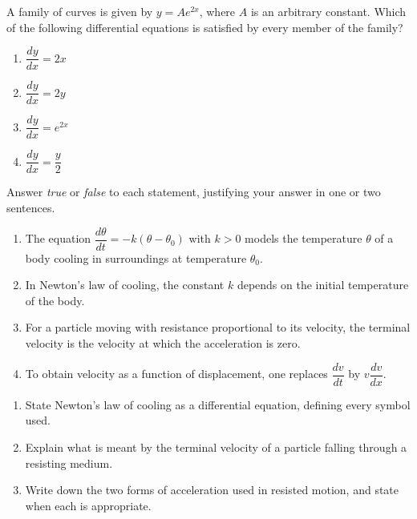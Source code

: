 \documentclass[11pt]{article}
\newcommand{\cle}[1]{{\popxbold\color{popdark}#1}}
\begin{document}
\begin{exercice}
A family of curves is given by $y = A e^{2x}$, where $A$ is an arbitrary constant. Which of the following differential equations is satisfied by every member of the family?

\begin{enumerate}
\item $\dfrac{dy}{dx} = 2x$
\item $\dfrac{dy}{dx} = 2y$
\item $\dfrac{dy}{dx} = e^{2x}$
\item $\dfrac{dy}{dx} = \dfrac{y}{2}$
\end{enumerate}
\end{exercice}

\begin{exercice}
Answer \emph{true} or \emph{false} to each statement, justifying your answer in one or two sentences.

\begin{enumerate}
\item The equation $\dfrac{d\theta}{dt} = -k(\theta - \theta_0)$ with $k > 0$ models the temperature $\theta$ of a body cooling in surroundings at temperature $\theta_0$.
\item In Newton's law of cooling, the constant $k$ depends on the initial temperature of the body.
\item For a particle moving with resistance proportional to its velocity, the terminal velocity is the velocity at which the acceleration is zero.
\item To obtain velocity as a function of displacement, one replaces $\dfrac{dv}{dt}$ by $v\dfrac{dv}{dx}$.
\end{enumerate}
\end{exercice}

\begin{exercice}
\begin{enumerate}
\item State Newton's law of cooling as a differential equation, defining every symbol used.
\item Explain what is meant by the \cle{terminal velocity} of a particle falling through a resisting medium.
\item Write down the two forms of acceleration used in resisted motion, and state when each is appropriate.
\end{enumerate}
\end{exercice}
\end{document}
